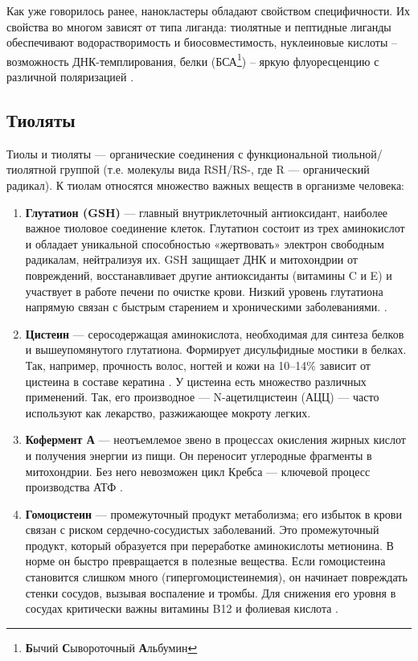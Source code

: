 \documentclass[a4paper,12pt]{article}
\begin{document}
\begin{onehalfspace}
	 Как уже говорилось ранее, нанокластеры обладают свойством специфичности. Их свойства во многом зависят от типа лиганда: тиолятные и пептидные лиганды обеспечивают водорастворимость и биосовместимость, нуклеиновые кислоты – возможность ДНК-темплирования, белки (БСА\footnote{\textbf{Б}ычий \textbf{С}ывороточный \textbf{А}льбумин}) – яркую флуоресценцию с различной поляризацией \cite{Han2025, He2025}. 
	
	
	\newpage
	
	\subsection*{Тиоляты}
	
	Тиолы и тиоляты — органические соединения с функциональной тиольной/тиолятной группой (т.е. молекулы вида RSH/RS-, где R — органический радикал). К тиолам относятся множество важных веществ в организме человека:
	
	\begin{enumerate}
		\item \textbf{Глутатион (GSH)} — главный внутриклеточный антиоксидант, наиболее важное тиоловое соединение клеток. Глутатион состоит из трех аминокислот и обладает уникальной способностью «жертвовать» электрон свободным радикалам, нейтрализуя их. GSH защищает ДНК и митохондрии от повреждений, восстанавливает другие антиоксиданты (витамины C и E) и участвует в работе печени по очистке крови. Низкий уровень глутатиона напрямую связан с быстрым старением и хроническими заболеваниями.
		\cite{TOWNSEND2003145}.
		\item \textbf{Цистеин} — серосодержащая аминокислота, необходимая для синтеза белков и вышеупомянутого глутатиона. Формирует дисульфидные мостики в белках. Так, например, прочность волос, ногтей и кожи на 10–14\% зависит от цистеина в составе кератина \cite{Sohrab2021, Cysteine}. У цистеина есть множество различных применений. Так, его производное — N-ацетилцистеин (АЦЦ) — часто используют как лекарство, разжижающее мокроту легких.
		\item \textbf{Кофермент А} — неотъемлемое звено в процессах окисления жирных кислот и получения энергии из пищи. Он переносит углеродные фрагменты в митохондрии. Без него невозможен цикл Кребса — ключевой процесс производства АТФ \cite{ijms21239057}. 
		\item \textbf{Гомоцистеин} — промежуточный продукт метаболизма; его избыток в крови связан с риском сердечно-сосудистых заболеваний. Это промежуточный продукт, который образуется при переработке аминокислоты метионина. В норме он быстро превращается в полезные вещества. Если гомоцистеина становится слишком много (гипергомоцистеинемия), он начинает повреждать стенки сосудов, вызывая воспаление и тромбы. Для снижения его уровня в сосудах критически важны витамины B12 и фолиевая кислота \cite{Kumar2017}.
	\end{enumerate}
	

\end{onehalfspace}
\end{document}
